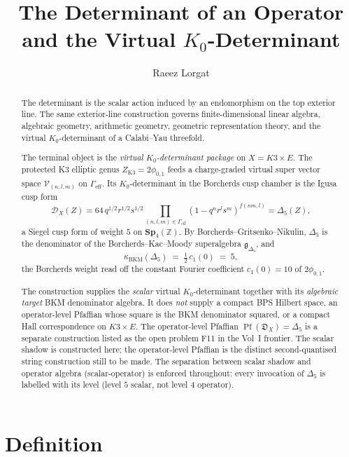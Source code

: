 \documentclass[11pt]{memoir}
\title{The Determinant of an Operator and the Virtual $K_0$-Determinant}
\author{Raeez Lorgat}
\date{}
\providecommand{\Pf}{\operatorname{Pf}}
\providecommand{\BKM}{\operatorname{BKM}}
\providecommand{\cD}{\mathcal{D}}
\providecommand{\cV}{\mathcal{V}}
\providecommand{\bZ}{\mathbb{Z}}
\providecommand{\fg}{\mathfrak{g}}
\begin{document}
\maketitle

\begin{abstract}
The determinant is the scalar action induced by an endomorphism on the
top exterior line. The same exterior-line construction governs
finite-dimensional linear algebra, algebraic geometry, arithmetic
geometry, geometric representation theory, and the virtual
$K_0$-determinant of a Calabi--Yau threefold.

The terminal object is the \emph{virtual $K_0$-determinant package} on
$X = K3 \times E$. The protected K3 elliptic genus
$Z_{\mathrm{K3}} = 2\phi_{0,1}$ feeds a charge-graded virtual super
vector space $\cV_{(n,l,m)}$ on $\Gamma_{\mathrm{eff}}$. Its
$K_0$-determinant in the Borcherds cusp chamber is the Igusa cusp form
\[
  \cD_X(Z) =
  64\,q^{1/2}r^{1/2}s^{1/2}
  \prod_{(n,l,m)\in\Gamma_{\mathrm{eff}}}
  (1 - q^{n}r^{l}s^{m})^{f(nm,l)}
  = \Delta_5(Z),
\]
a Siegel cusp form of weight $5$ on $\mathbf{Sp}_4(\bZ)$. By
Borcherds--Gritsenko--Nikulin, $\Delta_5$ is the denominator of the
Borcherds--Kac--Moody superalgebra $\fg_{\Delta_5}$, and
\[
  \kappa_{\BKM}(\Delta_5)
  \;=\; \tfrac12\,c_1(0)
  \;=\; 5,
\]
the Borcherds weight read off the constant Fourier coefficient
$c_1(0) = 10$ of $2\phi_{0,1}$.

The construction supplies the \emph{scalar} virtual $K_0$-determinant
together with its \emph{algebraic target} BKM denominator algebra. It
does \emph{not} supply a compact BPS Hilbert space, an operator-level
Pfaffian whose square is the BKM denominator squared, or a compact
Hall correspondence on $K3 \times E$. The operator-level Pfaffian
$\Pf(\mathfrak D_X) = \Delta_5$ is a separate construction listed as
the open problem F11 in the Vol~I frontier.  The scalar shadow is
constructed here; the operator-level Pfaffian is the
distinct second-quantised string construction still to be made.
The separation between scalar shadow and operator algebra
(scalar-operator) is enforced throughout: every invocation of $\Delta_5$ is
labelled with its level (level $5$ scalar, not level $4$ operator).
\end{abstract}

\tableofcontents

\chapter*{Definition}
\end{document}
